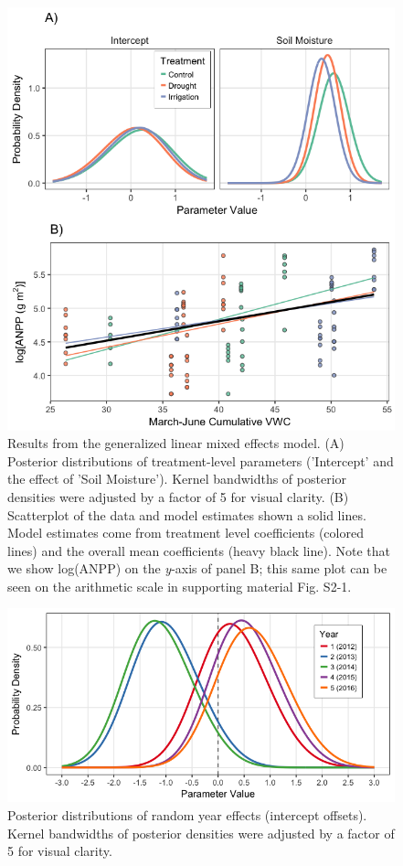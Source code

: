 \documentclass[fleqn,10pt,lineno]{wlpeerj} %
\begin{document}
\begin{figure}[!ht]
  \centering
      \includegraphics[width=5in]{../figures/glmm_main_results.png}
  \caption{Results from the generalized linear mixed effects model. (A) Posterior distributions of treatment-level parameters ('Intercept' and the effect of 'Soil Moisture'). Kernel bandwidths of posterior densities were adjusted by a factor of 5 for visual clarity. (B) Scatterplot of the data and model estimates shown a solid lines. Model estimates come from treatment level coefficients (colored lines) and the overall mean coefficients (heavy black line). Note that we show log(ANPP) on the \emph{y}-axis of panel B; this same plot can be seen on the arithmetic scale in supporting material Fig. S2-1.}
\end{figure}

\newpage{}

\begin{figure}[!ht]
  \centering
      \includegraphics[width=5in]{../figures/glmm_yeardiffs.png}
  \caption{Posterior distributions of random year effects (intercept offsets). Kernel bandwidths of posterior densities were adjusted by a factor of 5 for visual clarity.}
\end{figure}
\end{document}
